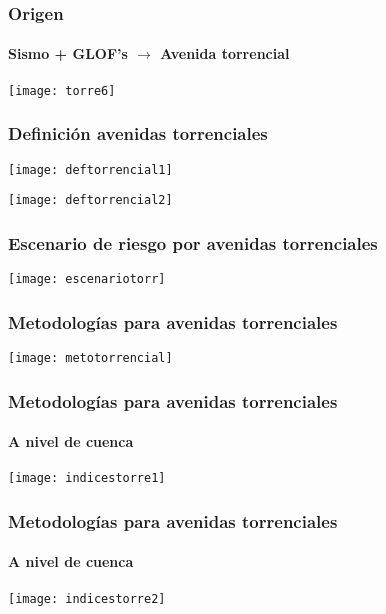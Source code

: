 \documentclass{beamer}
\begin{document}
\begin{frame}
\frametitle{Origen}
\framesubtitle{Sismo + GLOF's $\rightarrow$ Avenida torrencial}
\begin{center}
   	\texttt{[image: torre6]}
\end{center}
\end{frame}
\begin{frame}
\frametitle{Definición avenidas torrenciales}
\begin{center}
   	\texttt{[image: deftorrencial1]}
\end{center}
\end{frame}
\begin{frame}
\begin{center}
   	\texttt{[image: deftorrencial2]}
\end{center}
\end{frame}
\begin{frame}
\frametitle{Escenario de riesgo por avenidas torrenciales}
\begin{center}
   	\texttt{[image: escenariotorr]}
\end{center}
\end{frame}
\begin{frame}
\frametitle{Metodologías para avenidas torrenciales}
\begin{center}
   	\texttt{[image: metotorrencial]}
\end{center}
\end{frame}
\begin{frame}
\frametitle{Metodologías para avenidas torrenciales}
\framesubtitle{A nivel de cuenca}
\begin{center}
   	\texttt{[image: indicestorre1]}
\end{center}
\end{frame}
\begin{frame}
\frametitle{Metodologías para avenidas torrenciales}
\framesubtitle{A nivel de cuenca}
\begin{center}
   	\texttt{[image: indicestorre2]}
\end{center}
\end{frame}
\end{document}
